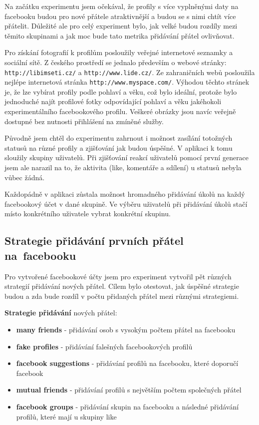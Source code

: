 \documentclass[thesis=M,czech]{FITthesis}[2013/05/10]
\begin{document}
Na začátku experimentu jsem očekával, že profily s více vyplněnými daty na facebooku budou pro nové přátele atraktivnější a budou se s nimi chtít více přátelit. Důležité ale pro celý experiment bylo, jak velké budou rozdíly mezi těmito skupinami a jak moc bude tato metrika přidávání přátel ovlivňovat.

Pro získání fotografií k profilům posloužily veřejné internetové seznamky a sociální sítě. Z českého prostředí se jednalo především o webové stránky: \verb|http://libimseti.cz/| a \verb|http://www.lide.cz/|. Ze zahraničních webů posloužila nejlépe internetová stránka \verb|http://www.myspace.com/|. Výhodou těchto stránek je, že lze vybírat profily podle pohlaví a věku, což bylo ideální, protože bylo jednoduché najít profilové fotky odpovídající pohlaví a věku jakéhokoli experimentálního facebookového profilu. Veškeré obrázky jsou navíc veřejně dostupné bez nutnosti přihlášení na zmíněné služby.

Původně jsem chtěl do experimentu zahrnout i možnost zasílání totožných statusů na různé profily a zjišťování jak budou úspěšné. V aplikaci k tomu sloužily skupiny uživatelů. Při zjišťování reakcí uživatelů pomocí první generace jsem ale narazil na to, že aktivita (like, komentáře a sdílení) u statusů nebyla vůbec žádná. 

Každopádně v aplikaci zůstala možnost hromadného přidávání úkolů na každý facebookový účet v dané skupině. Ve výběru uživatelů při přidávání úkolů stačí místo konkrétního uživatele vybrat konkrétní skupinu.

\subsection{Strategie přidávání prvních přátel na~facebooku}

Pro vytvořené facebookové účty jsem pro experiment vytvořil pět různých strategií přidávání nových přátel. Cílem bylo otestovat, jak úspěšné strategie budou a zda bude rozdíl v počtu přidaných přátel mezi různými strategiemi. 

\textbf{Strategie přidávání} nových přátel:

\begin{itemize}
  \item \textbf{many friends} - přidávání osob s vysokým počtem přátel na facebooku
  \item \textbf{fake profiles} - přidávání falešných facebookových profilů
  \item \textbf{facebook suggestions} - přidávání profilů na facebooku, které doporučí facebook 
  \item \textbf{mutual friends} - přidávání profilů s největším počtem společných přátel
  \item \textbf{facebook groups} - přidávání skupin na facebooku a následné přidávání profilů, které mají u skupiny like
\end{itemize}
\end{document}
